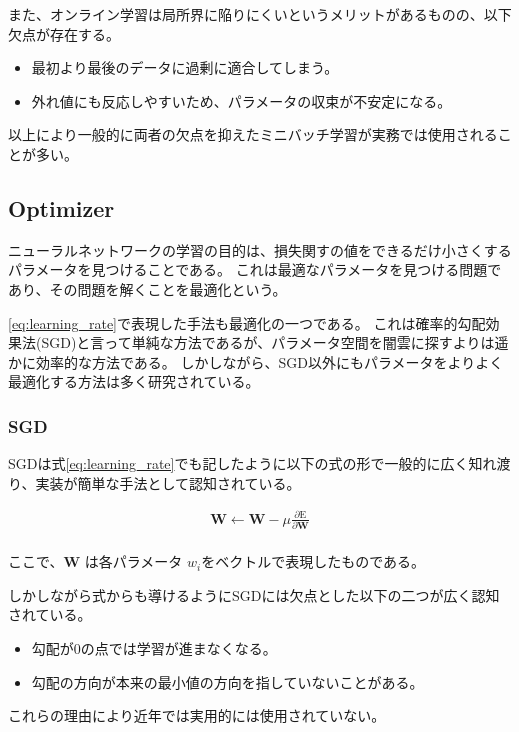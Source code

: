 また、オンライン学習は局所界に陥りにくいというメリットがあるものの、以下欠点が存在する。

\begin{itemize}
  \item 最初より最後のデータに過剰に適合してしまう。
  \item 外れ値にも反応しやすいため、パラメータの収束が不安定になる。
\end{itemize}

以上により一般的に両者の欠点を抑えたミニバッチ学習が実務では使用されることが多い。

\subsection{Optimizer}
ニューラルネットワークの学習の目的は、損失関すの値をできるだけ小さくするパラメータを見つけることである。
これは最適なパラメータを見つける問題であり、その問題を解くことを最適化という。

\ref{eq:learning_rate}で表現した手法も最適化の一つである。
これは確率的勾配効果法(SGD)と言って単純な方法であるが、パラメータ空間を闇雲に探すよりは遥かに効率的な方法である。
しかしながら、SGD以外にもパラメータをよりよく最適化する方法は多く研究されている。

\subsubsection{SGD}
SGDは式\ref{eq:learning_rate}でも記したように以下の式の形で一般的に広く知れ渡り、実装が簡単な手法として認知されている。

\begin{eqnarray}
\mathbf{W} \leftarrow \mathbf{W} - \mu \frac{\partial \mathrm{E}}{\partial \mathbf{W}} \\
\label{eq:sgd}
\end{eqnarray}

ここで、$ \mathbf{W} $ は各パラメータ $ w_i $をベクトルで表現したものである。

しかしながら式からも導けるようにSGDには欠点とした以下の二つが広く認知されている。




\begin{itemize}
  \item 勾配が$ 0 $の点では学習が進まなくなる。
  \item 勾配の方向が本来の最小値の方向を指していないことがある。
\end{itemize}
これらの理由により近年では実用的には使用されていない。

